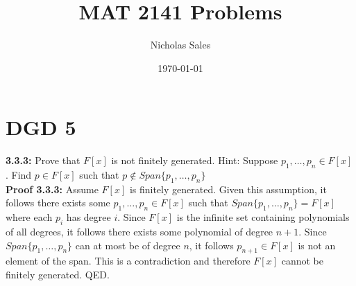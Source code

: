 \documentclass[11pt]{article}
\title{MAT 2141 Problems}
\author{Nicholas Sales}
\date{\today} %
\begin{document}
\maketitle

\tableofcontents
\newpage

\section{DGD 5}

\textbf{3.3.3:} Prove that $F[x]$ is not finitely generated. Hint: Suppose $p_1 , \dots , p_n \in F[x]$. Find $p \in F[x]$ such that $p \notin Span\{p_1 , \dots, p_n\}$ \\
\textbf{Proof 3.3.3:} Assume $F[x]$ is finitely generated. Given this assumption, it follows there exists some $p_1 , \dots , p_n \in F[x]$ such that $Span\{p_1 , \dots , p_n\} = F[x]$ where each $p_i$ has degree $i$. Since $F[x]$ is the infinite set containing polynomials of all degrees, it follows there exists some polynomial of degree $n + 1$. Since $Span\{p_1 , \dots , p_n\}$ can at most be of degree $n$, it follows $p_{n + 1} \in F[x]$ is not an element of the span. This is a contradiction and therefore $F[x]$ cannot be finitely generated. QED.
    
\end{document}
